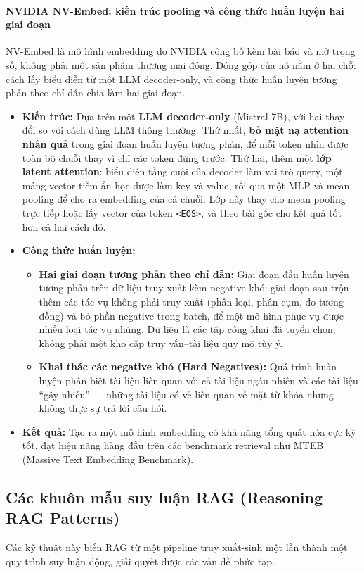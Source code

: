 \paragraph{NVIDIA NV-Embed: kiến trúc pooling và công thức huấn luyện hai giai đoạn}
NV-Embed \cite{lee2024nvembed} là mô hình embedding do NVIDIA công bố kèm bài báo và mở trọng số, không phải một sản phẩm thương mại đóng. Đóng góp của nó nằm ở hai chỗ: cách lấy biểu diễn từ một LLM decoder-only, và công thức huấn luyện tương phản theo chỉ dẫn chia làm hai giai đoạn.
\begin{itemize}
	\item \textbf{Kiến trúc:} Dựa trên một \textbf{LLM decoder-only} (Mistral-7B), với hai thay đổi so với cách dùng LLM thông thường. Thứ nhất, \textbf{bỏ mặt nạ attention nhân quả} trong giai đoạn huấn luyện tương phản, để mỗi token nhìn được toàn bộ chuỗi thay vì chỉ các token đứng trước. Thứ hai, thêm một \textbf{lớp latent attention}: biểu diễn tầng cuối của decoder làm vai trò query, một mảng vector tiềm ẩn học được làm key và value, rồi qua một MLP và mean pooling để cho ra embedding của cả chuỗi. Lớp này thay cho mean pooling trực tiếp hoặc lấy vector của token \texttt{<EOS>}, và theo bài gốc cho kết quả tốt hơn cả hai cách đó.
	\item \textbf{Công thức huấn luyện:}
	\begin{itemize}
		\item \textbf{Hai giai đoạn tương phản theo chỉ dẫn:} Giai đoạn đầu huấn luyện tương phản trên dữ liệu truy xuất kèm negative khó; giai đoạn sau trộn thêm các tác vụ không phải truy xuất (phân loại, phân cụm, đo tương đồng) và bỏ phần negative trong batch, để một mô hình phục vụ được nhiều loại tác vụ nhúng. Dữ liệu là các tập công khai đã tuyển chọn, không phải một kho cặp truy vấn--tài liệu quy mô tùy ý.
		\item \textbf{Khai thác các negative khó (Hard Negatives):} Quá trình huấn luyện phân biệt tài liệu liên quan với cả tài liệu ngẫu nhiên và các tài liệu “gây nhiễu” — những tài liệu có vẻ liên quan về mặt từ khóa nhưng không thực sự trả lời câu hỏi.
	\end{itemize}
	\item \textbf{Kết quả:} Tạo ra một mô hình embedding có khả năng tổng quát hóa cực kỳ tốt, đạt hiệu năng hàng đầu trên các benchmark retrieval như MTEB (Massive Text Embedding Benchmark).
\end{itemize}

\subsection{Các khuôn mẫu suy luận RAG (Reasoning RAG Patterns)}
\label{ssec:reasoning_rag_patterns}
Các kỹ thuật này biến RAG từ một pipeline truy xuất-sinh một lần thành một quy trình suy luận động, giải quyết được các vấn đề phức tạp.

